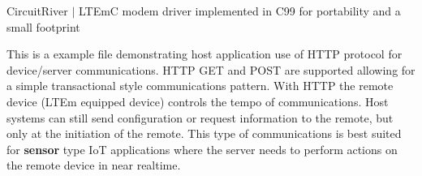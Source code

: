 Circuit\+River $\vert$ LTEmC modem driver implemented in C99 for portability and a small footprint

This is a example file demonstrating host application use of HTTP protocol for device/server communications. HTTP GET and POST are supported allowing for a simple transactional style communications pattern. With HTTP the remote device (LTEm equipped device) controls the tempo of communications. Host systems can still send configuration or request information to the remote, but only at the initiation of the remote. This type of communications is best suited for {\bfseries{sensor}} type IoT applications where the server needs to perform actions on the remote device in near realtime. 